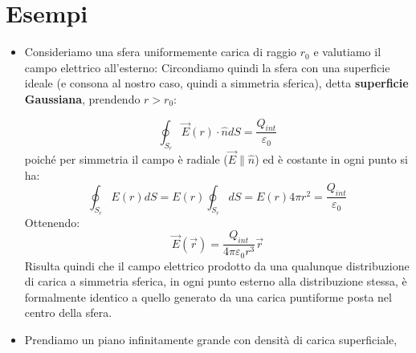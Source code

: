 \documentclass{book}
\begin{document}
\section{Esempi}
\begin{itemize}
    \item Consideriamo una sfera uniformemente carica di raggio $r_0$ e valutiamo il campo elettrico all'esterno: 
    Circondiamo quindi la sfera con una superficie ideale (e consona al nostro caso, quindi a simmetria sferica), detta \textbf{superficie Gaussiana}, prendendo $r>r_0$:

    $$
    \oint_{S_r} \vec{E}(r) \cdot \hat{n}dS = \frac{Q_{int}}{\varepsilon_0}
    $$
    poiché per simmetria il campo è radiale ($\vec{E} \parallel \hat{n}$) ed è costante in ogni punto si ha:
    $$
    \oint_{S_r} E(r) dS = E(r) \oint_{S_r} dS = E(r)  4\pi r^2 = \frac{Q_{int}}{\varepsilon_0}
    $$
    Ottenendo:
    $$
    \vec{E}(\vec{r})= \frac{Q_{int}}{4 \pi \varepsilon_0 r^3} \vec{r}
    $$
   Risulta quindi che il campo elettrico prodotto da una qualunque distribuzione di carica a simmetria sferica, in ogni punto esterno alla distribuzione stessa, è formalmente identico a quello generato da una carica puntiforme posta nel centro della sfera.
   \item Prendiamo un piano infinitamente grande con densità di carica superficiale,
   

\end{itemize}
\end{document}
